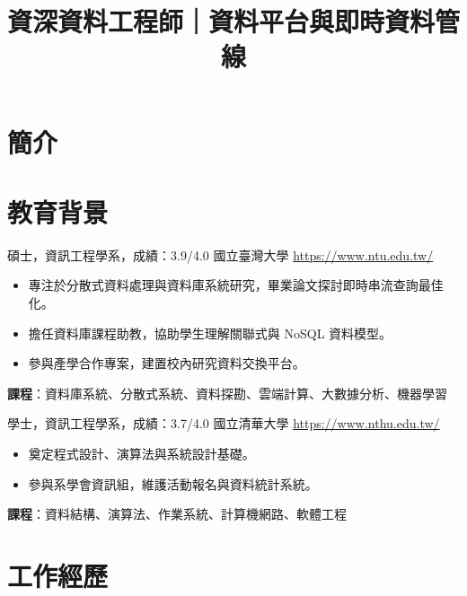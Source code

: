 \documentclass[a4paper, serif, 10pt]{moderncv}
\title{資深資料工程師｜資料平台與即時資料管線}
\begin{document}
\maketitle

\section{簡介}

\section{教育背景}

        {碩士，資訊工程學系，成績：3.9/4.0}
        {國立臺灣大學}
        {\url{https://www.ntu.edu.tw/}}
        {}
        {\begin{itemize}
\item 專注於分散式資料處理與資料庫系統研究，畢業論文探討即時串流查詢最佳化。
\item 擔任資料庫課程助教，協助學生理解關聯式與 NoSQL 資料模型。
\item 參與產學合作專案，建置校內研究資料交換平台。
\end{itemize}
\textbf{課程}：資料庫系統、分散式系統、資料探勘、雲端計算、大數據分析、機器學習}

        {學士，資訊工程學系，成績：3.7/4.0}
        {國立清華大學}
        {\url{https://www.nthu.edu.tw/}}
        {}
        {\begin{itemize}
\item 奠定程式設計、演算法與系統設計基礎。
\item 參與系學會資訊組，維護活動報名與資料統計系統。
\end{itemize}
\textbf{課程}：資料結構、演算法、作業系統、計算機網路、軟體工程}
\section{工作經歷}
\end{document}
